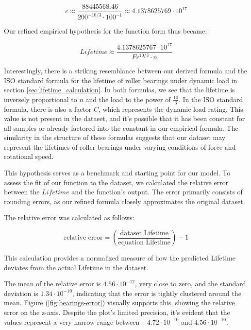 \begin{equation}
\label{eq:constant_c}
c \approx \frac{88445568.46}{200^{-10/3} \cdot 100^{-1}} \approx 4.1378625769 \cdot 10^{17}
\end{equation}

Our refined empirical hypothesis for the function form thus became:

\begin{equation}
\label{eq:refined_hypothesis}
Lifetime \approx \frac{4.1378625767 \cdot 10^{17}}{Fr^{10/3} \cdot n}
\end{equation}

Interestingly, there is a striking resemblance between our derived formula and the ISO standard formula for the lifetime of roller bearings under dynamic load in section \ref{sec:lifetime_calculation}. In both formulas, we see that the lifetime is inversely proportional to \(n\) and the load to the power of \(\frac{10}{3}\). In the ISO standard formula, there is also a factor \(C\), which represents the dynamic load rating. This value is not present in the dataset, and it's possible that it has been constant for all samples or already factored into the constant in our empirical formula. The similarity in the structure of these formulas suggests that our dataset may represent the lifetimes of roller bearings under varying conditions of force and rotational speed.

This hypothesis serves as a benchmark and starting point for our model. To assess the fit of our function to the dataset, we calculated the relative error between the \(Lifetime\) and the function's output. The error primarily consists of rounding errors, as our refined formula closely approximates the original dataset.

The relative error was calculated as follows:

\begin{equation}
\text{relative error} = \left(\frac{\text{dataset Lifetime}}{\text{equation Lifetime}}\right) - 1
\end{equation}

This calculation provides a normalized measure of how the predicted Lifetime deviates from the actual Lifetime in the dataset.

The mean of the relative error is \(4.56 \cdot 10^{-12}\), very close to zero, and the standard deviation is \(1.34 \cdot 10^{-10}\), indicating that the error is tightly clustered around the mean. Figure (\ref{fig:bearings-error}) visually supports this, showing the relative error on the z-axis. Despite the plot's limited precision, it's evident that the values represent a very narrow range between \(-4.72 \cdot 10^{-10}\) and \(4.56 \cdot 10^{-10}\).

